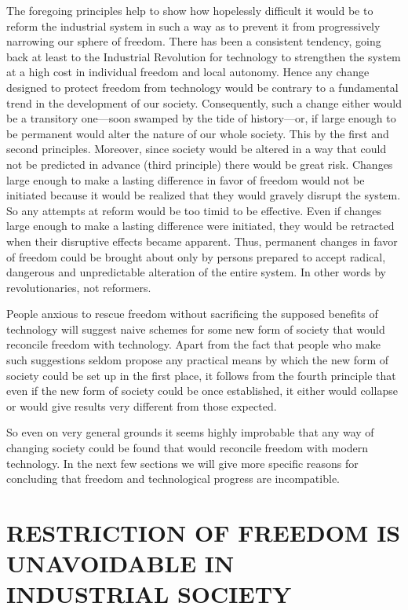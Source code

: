  The foregoing principles help to show how hopelessly difficult it would be to reform the industrial system in such a way as to prevent it from progressively narrowing our sphere of freedom. There has been a consistent tendency, going back at least to the Industrial Revolution for technology to strengthen the system at a high cost in individual freedom and local autonomy. Hence any change designed to protect freedom from technology would be contrary to a fundamental trend in the development of our society. Consequently, such a change either would be a transitory one—soon swamped by the tide of history—or, if large enough to be permanent would alter the nature of our whole society. This by the first and second principles. Moreover, since society would be altered in a way that could not be predicted in advance (third principle) there would be great risk. Changes large enough to make a lasting difference in favor of freedom would not be initiated because it would be realized that they would gravely disrupt the system. So any attempts at reform would be too timid to be effective. Even if changes large enough to make a lasting difference were initiated, they would be retracted when their disruptive effects became apparent. Thus, permanent changes in favor of freedom could be brought about only by persons prepared to accept radical, dangerous and unpredictable alteration of the entire system. In other words by revolutionaries, not reformers.

 People anxious to rescue freedom without sacrificing the supposed benefits of technology will suggest naive schemes for some new form of society that would reconcile freedom with technology. Apart from the fact that people who make such suggestions seldom propose any practical means by which the new form of society could be set up in the first place, it follows from the fourth principle that even if the new form of society could be once established, it either would collapse or would give results very different from those expected.

 So even on very general grounds it seems highly improbable that any way of changing society could be found that would reconcile freedom with modern technology. In the next few sections we will give more specific reasons for concluding that freedom and technological progress are incompatible.

\chapter{RESTRICTION OF FREEDOM IS UNAVOIDABLE IN INDUSTRIAL SOCIETY}

